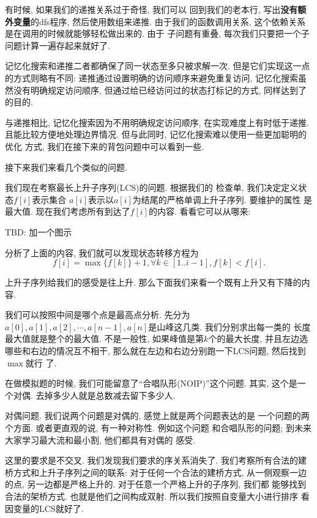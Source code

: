  有时候, 如果我们的递推关系过于奇怪, 我们可以
回到我们的老本行, 写出\textbf{没有额外变量}的dfs程序, 然后使用数组来递推. 
由于我们的函数调用关系, 这个依赖关系是在调用的时候就能够轻松做出来的. 由于
子问题有重叠, 每次我们只要把一个子问题计算一遍存起来就好了. 

记忆化搜索和递推二者都确保了同一状态至多只被求解一次. 但是它们实现这一点
的方式则略有不同: 递推通过设置明确的访问顺序来避免重复访问, 
记忆化搜索虽然没有明确规定访问顺序, 但通过给已经访问过的状态打标记的方式, 
同样达到了的目的. 

与递推相比, 记忆化搜索因为不用明确规定访问顺序, 在实现难度上有时低于递推. 
且能比较方便地处理边界情况. 但与此同时, 记忆化搜索难以使用一些更加聪明的优化
方式, 我们在接下来的背包问题中可以看到一些. 


接下来我们来看几个类似的问题. 

 我们现在考察最长上升子序列(LCS)的问题. 根据我们的
检查单, 我们决定定义状态$f[i]$表示集合
$a[i]$表示以$a[i]$为结尾的严格单调上升子序列. 要维护的属性
是最大值. 现在我们考虑所有到达了$f[i]$的内容. 看看它可以从哪来: 

TBD: 加一个图示

分析了上面的内容, 我们就可以发现状态转移方程为 
$$f[i] = \max \{f[k]\} +1, \forall k\in [1..i-1], f[k]<f[i].$$

上升子序列给我们的感受是往上升. 那么下面我们来看一个既有上升又有下降的内容. 

我们可以按照中间是哪个点是最高点分析. 先分为
$a[0],a[1], a[2],\cdots, a[n-1], a[n]$是山峰这几类. 我们分别求出每一类的
长度最大值就是整个的最大值. 不是一般性, 如果峰值是第$k$个的最大长度, 并且左边选
哪些和右边的情况互不相干, 那么就在左边和右边分别跑一下LCS问题, 然后找到$\max$就行
了. 

在做模拟题的时候, 我们可能留意了``合唱队形(NOIP)''这个问题. 其实, 这个是一个对偶.
去掉多少人就是总数减去留下多少人. 

\begin{remark}
    对偶问题. 我们说两个问题是对偶的, 感觉上就是两个问题表达的是
    一个问题的两个方面. 或者更直观的说, 有一种对称性. 例如这个问题
    和合唱队形的问题; 到未来大家学习最大流和最小割, 他们都具有对偶的
    感受. 
\end{remark}

 这里的要求是不交叉. 我们发现我们要求的序关系消失了. 
我们考察所有合法的建桥方式和上升子序列之间的联系: 对于任何一个合法的建桥方式, 
从一侧观察一边的点, 另一边都是严格上升的. 对于任意一个严格上升的子序列, 我们都
能够找到合法的架桥方式. 也就是他们之间构成双射. 所以我们按照自变量大小进行排序
看因变量的LCS就好了. 

